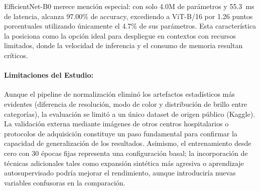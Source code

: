 EfficientNet-B0 merece mención especial: con solo 4.0M de parámetros y 55.3~ms de latencia, alcanza 97.00\% de accuracy, excediendo a ViT-B/16 por 1.26 puntos porcentuales utilizando únicamente el 4.7\% de sus parámetros. Esta característica la posiciona como la opción ideal para despliegue en contextos con recursos limitados, donde la velocidad de inferencia y el consumo de memoria resultan críticos.

\paragraph{Limitaciones del Estudio:}

Aunque el pipeline de normalización eliminó los artefactos estadísticos más evidentes (diferencia de resolución, modo de color y distribución de brillo entre categorías), la evaluación se limitó a un único dataset de origen público (Kaggle). La validación externa mediante imágenes de otros centros hospitalarios o protocolos de adquisición constituye un paso fundamental para confirmar la capacidad de generalización de los resultados. Asimismo, el entrenamiento desde cero con 30 épocas fijas representa una configuración basal; la incorporación de técnicas adicionales tales como expansión sintética más agresiva o aprendizaje autosupervisado podría mejorar el rendimiento, aunque introduciría nuevas variables confusoras en la comparación.
